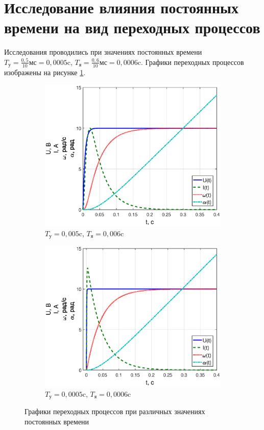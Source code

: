 \documentclass[12pt,a4paper]{article}
\begin{document}
\newpage
\section{Исследование влияния постоянных времени на вид переходных процессов}
Исследования проводились при значениях постоянных времени $T_\text{у} = \frac{0,5}{10} \text{мс} = 0,0005$c, $T_\text{я} = \frac{0,6}{10} \text{мс} = 0,0006$c. Графики переходных процессов изображены на рисунке \ref{UIwa0056}.
\begin{figure}[H]
	\centering
	\begin{subfigure}[b]{0.48\textwidth}
	    \includegraphics[width = \textwidth]{056}
		\caption{$T_\text{у} = 0,005$c, $T_\text{я} = 0,006$c}
	\end{subfigure}
	\hfill
	\begin{subfigure}[b]{0.48\textwidth}
		\includegraphics[width = \textwidth]{0056}
		\caption{$T_\text{у} = 0,0005$c, $T_\text{я} = 0,0006$c}
	\end{subfigure}
	\caption{Графики переходных процессов при различных значениях постоянных времени}
	\label{UIwa0056}
\end{figure}
\end{document}
